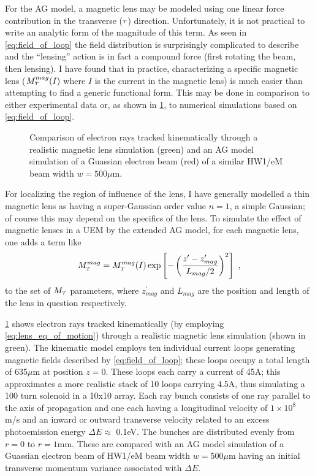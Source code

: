 For the AG model, a magnetic lens may be modeled using one linear force contribution in the transverse ($ {\scriptscriptstyle T} $) direction.
Unfortunately, it is not practical to write an analytic form of the magnitude of this term.
As seen in \ref{eq:field_of_loop} the field distribution is surprisingly complicated to describe and the ``lensing'' action is in fact a compound force (first rotating the beam, then lensing).
I have found that in practice, characterizing a specific magnetic lens ($M_{{\scriptscriptstyle T}}^{mag}(I)$ where $I$ is the current in the magnetic lens) is much easier than attempting to find a generic functional form.
This may be done in comparison to either experimental data or, as shown in \ref{fig:mag_lens_loops}, to numerical simulations based on \ref{eq:field_of_loop}.

\begin{figure}
  \centering
  
  \caption[Comparison of the AG model and a kinematic model of a magnetic lens]{
    Comparison of electron rays tracked kinematically through a realistic magnetic lens simulation (green) and an AG model simulation of a Guassian electron beam (red) of a similar HW1/eM beam width $ w = 500 \mu\text{m} $.
  }
  \label{fig:mag_lens_loops}
\end{figure}

For localizing the region of influence of the lens, I have generally modelled a thin magnetic lens as having a super-Gaussian order value $n=1$, a simple Gaussian; of course this may depend on the specifics of the lens.
To simulate the effect of magnetic lenses in a UEM by the extended AG model, for each magnetic lens, one adds a term like
\begin{equation}
  M_{{\scriptscriptstyle T}}^{mag} = M_{{\scriptscriptstyle T}}^{mag}(I) \exp \left [ - \left (  \frac{ z^{\prime} - z_{mag}^{\prime} }{ L_{mag} / 2 } \right )^{ 2 } \right ] \text{ ,}
\end{equation}
to the set of $M_{{\scriptscriptstyle T}}$ parameters, where $z_{mag}^{\prime}$ and $L_{mag}$ are the position and length of the lens in question respectively.

\ref{fig:mag_lens_loops} shows electron rays tracked kinematically (by employing \ref{eq:lens_eq_of_motion}) through a realistic magnetic lens simulation (shown in green).
The kinematic model employs ten individual current loops generating magnetic fields described by \ref{eq:field_of_loop}; these loops occupy a total length of 635$\mu$m at position $z=0$.
These loops each carry a current of 45A; this approximates a more realistic stack of 10 loops carrying 4.5A, thus simulating a  100 turn solenoid in a 10x10 array.
Each ray bunch consists of one ray parallel to the axis of propagation and one each having a longitudinal velocity of $1 \times 10^{8}$ m/s and an inward or outward transverse velocity related to an excess photoemission energy $\Delta E \approx $ 0.1eV.
The bunches are distributed evenly from $r=0$ to $r = 1$mm.
These are compared with an AG model simulation of a Guassian electron beam of HW1/eM beam width $ w = 500 \mu\text{m} $ having an initial transverse momentum variance associated with $\Delta E$.

